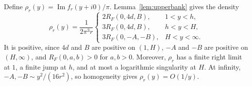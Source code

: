 Define $\rho_r(y)=\operatorname{Im}f_r(y+i0)/\pi$.
Lemma~\ref{lem:upperbank} gives the density
\begin{equation}\label{eq:rho}
 \rho_r(y)=\frac1{2\pi^3r}
 \begin{cases}
 2R_F(0,4d,B),&1<y<h,\\
 3R_F(0,4d,B),&h<y<H,\\
 3R_F(0,-A,-B),&H<y<\infty.
 \end{cases}
\end{equation}
It is positive, since $4d$ and $B$ are positive on $(1,H)$, $-A$ and $-B$
are positive on $(H,\infty)$, and $R_F(0,a,b)>0$ for $a,b>0$.
Moreover, $\rho_r$ has a finite right limit at $1$, a finite jump at $h$,
and at most a logarithmic singularity at $H$. At infinity,
$-A,-B\sim y^2/(16r^2)$, so homogeneity gives $\rho_r(y)=O(1/y)$.

